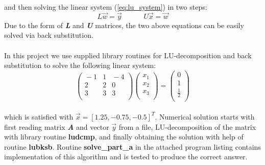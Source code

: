 \documentclass[]{article}
\begin{document}
  and then solving the linear system (\ref{eq:lu_system}) in two steps:
  \begin{equation}
    L{\vec w} = {\vec y} \;\;\;\;\;\;\;\;\;\;\; U{\vec x} = {\vec w} \label{eq:sys_diag}
  \end{equation} 
  Due to the form of {\bf \it L} and {\bf \it U} matrices, the two above equations can be easily solved via back substitution.\\
  \\
  In this project we use supplied library routines for LU-decomposition and back substitution to solve the following
  linear system:
  \begin{equation}
    \left(\begin{array}{ccc}
     \!\!\! -1 &  1& \!\!\! -4 \\
      2  &2 &0  \\
      3  &3 &3  \\
    \end{array}
    \right)\left(\begin{array}{c}
      x_1     \\
      x_2     \\
      x_3     \\
    \end{array} \right)
    =
    \left(\begin{array}{c}
      0     \\
      1     \\
      \frac{1}{2} \\
    \end{array} \right)\nonumber
  \end{equation}
  \\
  which is satisfied with ${\vec x} = [1.25, -0.75, -0.5]^T$. Numerical solution starts with first reading matrix {\bf \it A}
  and vector ${\vec y}$ from a file, LU-decomposition of the matrix with library routine {\bf ludcmp}, and finally
  obtaining the solution with help of routine {\bf lubksb}. Routine {\bf solve\_part\_a} in the attached program listing
  contains implementation of this algorithm and is tested to produce the correct answer.
\end{document}
